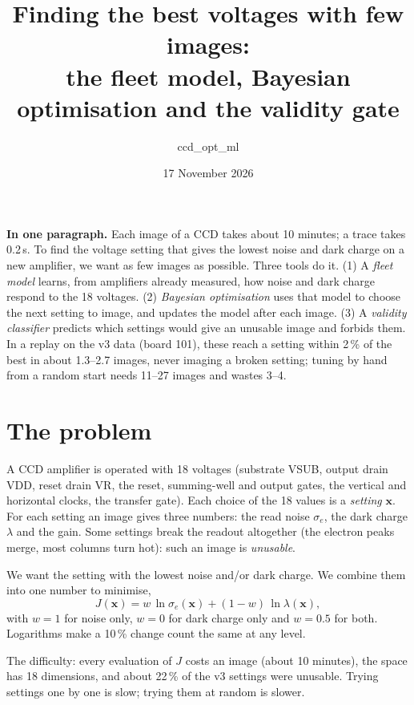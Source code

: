 \documentclass[11pt]{article}
\title{Finding the best voltages with few images:\\ the fleet model, Bayesian optimisation and the validity gate}
\author{ccd\_opt\_ml}
\date{17 November 2026}
\newcommand{\key}[2][boxbg]{\par\medskip\noindent\colorbox{#1}{\parbox{\dimexpr\linewidth-2\fboxsep}{#2}}\par\medskip}
\newcommand{\x}{\mathbf{x}}
\begin{document}
\maketitle

\key{\textbf{In one paragraph.} Each image of a CCD takes about 10 minutes; a trace takes 0.2\,s. To find the voltage
setting that gives the lowest noise and dark charge on a new amplifier, we want as few images as possible. Three tools do
it. (1) A \emph{fleet model} learns, from amplifiers already measured, how noise and dark charge respond to the 18
voltages. (2) \emph{Bayesian optimisation} uses that model to choose the next setting to image, and updates the model after
each image. (3) A \emph{validity classifier} predicts which settings would give an unusable image and forbids them. In a
replay on the v3 data (board 101), these reach a setting within 2\,\% of the best in about 1.3--2.7 images, never imaging a
broken setting; tuning by hand from a random start needs 11--27 images and wastes 3--4.}

\tableofcontents

\section{The problem}
A CCD amplifier is operated with 18 voltages (substrate VSUB, output drain VDD, reset drain VR, the reset, summing-well and
output gates, the vertical and horizontal clocks, the transfer gate). Each choice of the 18 values is a \emph{setting}
$\x$. For each setting an image gives three numbers: the read noise $\sigma_e$, the dark charge $\lambda$ and the gain.
Some settings break the readout altogether (the electron peaks merge, most columns turn hot): such an image is
\emph{unusable}.

We want the setting with the lowest noise and/or dark charge. We combine them into one number to minimise,
\begin{equation}
J(\x) = w\,\ln\sigma_e(\x) + (1-w)\,\ln\lambda(\x),
\end{equation}
with $w=1$ for noise only, $w=0$ for dark charge only and $w=0.5$ for both. Logarithms make a 10\,\% change count the same
at any level.

The difficulty: every evaluation of $J$ costs an image (about 10 minutes), the space has 18 dimensions, and about 22\,\% of
the v3 settings were unusable. Trying settings one by one is slow; trying them at random is slower.
\end{document}
